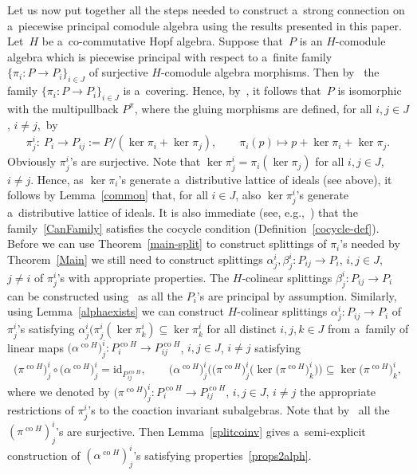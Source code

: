 \documentclass[pdftex]{sigma}
\DeclareMathOperator{\co}{co}
\begin{document}
Let us now put together all the steps needed to construct a~strong connection on a~piecewise principal comodule algebra
using the results presented in this paper.
Let~$H$ be a~co-commutative Hopf algebra.
Suppose that~$P$ is an $H$-comodule algebra which is piecewise principal with respect to a~f\/inite family
$\{\pi_i:P\rightarrow P_i\}_{i\in J}$ of surjective $H$-comodule algebra morphisms.
Then by~\cite[Corollary~3.7]{hkmz11} the family $\{\pi_i:P\rightarrow P_i\}_{i\in J}$ is a~covering.
Hence, by~\cite[Proposition~3]{CM2000}, it follows that~$P$ is isomorphic with the multipullback $P^\pi$, where the
gluing morphisms are def\/ined, for all $i,j\in J$, $i\neq j$,~by
\begin{gather}
\label{CanFamily}
\pi^i_j: \ P_i\longrightarrow P_{ij}:=P/(\ker\pi_i+\ker\pi_j),
\qquad
\pi_i(p)\longmapsto p+\ker\pi_i+\ker\pi_j.
\end{gather}
Obviously $\pi^i_j$'s are surjective.
Note that $\ker\pi^i_j=\pi_i(\ker\pi_j)$ for all $i,j\in J$, $i\neq j$.
Hence, as $\ker\pi_i$'s generate a~distributive lattice of ideals (see above), it follows by Lemma~\ref{common} that,
for all $i\in J$, also $\ker\pi^i_j$'s generate a~distributive lattice of ideals.
It is also immediate (see, e.g.,~\cite[Remark~2]{CM2000}) that the family~\eqref{CanFamily} satisf\/ies the cocycle
condition (Def\/inition~\ref{cocycle-def}).
Before we can use Theorem~\ref{main-split} to construct splittings of $\pi_i$'s needed by Theorem~\ref{Main} we still
need to construct splittings $\alpha^i_j,\beta^i_j:P_{ij}\rightarrow P_i$, $i,j\in J$,
$j\neq i$ of $\pi^i_j$'s with appropriate properties.
The $H$-colinear splittings $\beta^i_j:P_{ij}\rightarrow P_i$ can be constructed using~\cite[Lemma~3.1]{hkmz11} as all
the $P_{i}$'s are principal by assumption.
Similarly, using Lemma~\ref{alphaexists} we can construct $H$-colinear splittings $\alpha^i_j:P_{ij}\rightarrow P_i$ of
$\pi^i_j$'s satisfying $\alpha^i_j(\pi^i_j(\ker{}\pi^i_k)\subseteq\ker\pi^i_k$ for all distinct $i,j,k\in J$ from
a~family of linear maps $\big(\alpha^{\co H}\big)^i_j:P_i^{\co H}\rightarrow P_{ij}^{\co H}$, $i,j\in J$, $i\neq j$ satisfying
\begin{gather}
\label{props2alph}
\big(\pi^{\co H}\big)^i_j\circ\big(\alpha^{\co H}\big)^i_j=\mathrm{id}_{P_{ij}^{\co H}},
\qquad
\big(\alpha^{\co H}\big)^i_j\big(\big(\pi^{\co H}\big)^i_j\big(\ker\big(\pi^{\co H}\big)^i_k\big)\big)\subseteq\ker\big(\pi^{\co H}\big)^i_k,
\end{gather}
where we denoted by $\big(\pi^{\co H}\big)^i_j:P_i^{\co H}\rightarrow P_{ij}^{\co H}$, $i,j\in J$, $i\neq j$
the appropriate restrictions of $\pi^i_j$'s to the coaction invariant subalgebras.
Note that by~\cite[Lemma~3.1]{hkmz11} all the $(\pi^{\co H})^i_j$'s are surjective.
Then Lemma~\ref{splitcoinv} gives a~semi-explicit construction of $(\alpha^{\co H})^i_j$'s satisfying properties~\eqref{props2alph}.
\end{document}
